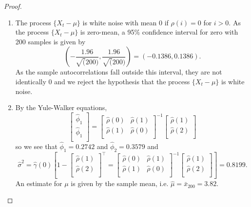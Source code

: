 \documentclass[12pt]{article}
\theoremstyle{definition}
\begin{document}
\begin{proof}
  \begin{enumerate}
    \item The process $\{X_t - \mu\}$ is white noise with mean 0 if $\rho(i) = 0$ for $i > 0$.
      As the process $\{X_t - \mu\}$ is zero-mean, a 95\% confidence interval for zero
      with 200 samples is given by
      \[
        \left(-\frac{1.96}{\sqrt(200)}, \frac{1.96}{\sqrt(200)}\right) = (-0.1386, 0.1386).
      \]
      As the sample autocorrelations fall outside this interval, they are not identically
      0 and we reject the hypothesis that the process $\{X_t - \mu\}$ is white noise.
    \item By the Yule-Walker equations,
      \[
        \begin{bmatrix}
          \hat{\phi}_1 \\
          \hat{\phi}_1 \\
        \end{bmatrix}
        =
        \begin{bmatrix}
          \hat{\rho}(0) & \hat{\rho}(1)\\
          \hat{\rho}(1) & \hat{\rho}(0) \\
        \end{bmatrix} ^{-1}
        \begin{bmatrix}
          \hat{\rho}(1) \\
          \hat{\rho}(2) \\
        \end{bmatrix}
      \]
      so we see that $\hat{\phi}_1 = 0.2742$ and $\hat{\phi}_2 = 0.3579$ and
      \[
      \hat{\sigma}^2 = \hat{\gamma}(0)\left[1 -   \begin{bmatrix}
          \hat{\rho}(1) \\
          \hat{\rho}(2) \\
        \end{bmatrix}^{\intercal}
        =
        \begin{bmatrix}
          \hat{\rho}(0) & \hat{\rho}(1)\\
          \hat{\rho}(1) & \hat{\rho}(0) \\
        \end{bmatrix} ^{-1}
        \begin{bmatrix}
          \hat{\rho}(1) \\
          \hat{\rho}(2) \\
        \end{bmatrix}\right] = 0.8199.
      \]
      An estimate for $\mu$ is given by the sample mean, i.e. $\hat{\mu} = \bar{x}_{200} = 3.82.$

\end{enumerate}
\end{proof}
\end{document}
